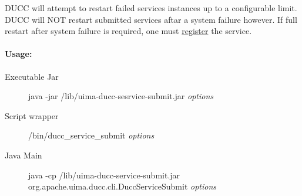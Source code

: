     DUCC will attempt to restart failed services instances up to a configurable limit.  DUCC will
    NOT restart submitted services aftar a system failure however.  If full restart after system
    failure is required, one must \hyperref[subsec:cli.ducc-services.register]{register} the
    service.
 

    \paragraph{Usage:}
    \begin{description}
    \item[Executable Jar] java -jar \ducchome/lib/uima-ducc-sesrvice-submit.jar {\em options}
    \item[Script wrapper] \ducchome/bin/ducc\_service\_submit {\em options}
    \item[Java Main]      java -cp \ducchome/lib/uima-ducc-service-submit.jar org.apache.uima.ducc.cli.DuccServiceSubmit {\em options}
    \end{description}

